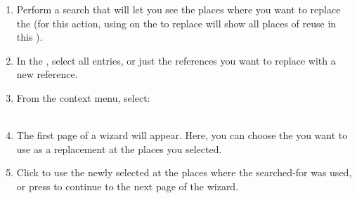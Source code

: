 \begin{enumerate}
\item Perform a search that will let you see the places where you want to replace the \gdcase{} (for this action, using   on the \gdcase{} to replace will show all places of reuse in this \gdproject{}). 
\item In the \gdsearchresultview{}, select all entries, or just the \gdcase{} references you want to replace with a new \gdcase{} reference. 
\item From the context menu, select:\\
\\
\item The first page of a wizard will appear. Here, you can choose the \gdcase{} you want to use as a replacement at the places you selected.
\item Click  to use the newly selected \gdcase{} at the places where the searched-for \gdcase{} was used, or press  to continue to the next page of the wizard.
\end{enumerate}
